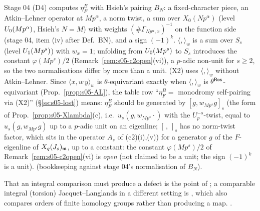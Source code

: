 \begin{remark}\label{rem:s05-BN}
Stage 04 (D4) computes $\eta^B_F$ with Hsieh's pairing $B_N$: a fixed-character piece, an Atkin--Lehner operator at $Mp^\alpha$, a norm
twist, a sum over $X_0(Np^\alpha)$ (level $U_0(Mp^\alpha)$, Hsieh's $N=M$) with weights $(\#\Gamma_{Np^\alpha,x})^{-1}$ on the function side
 (stage 04, item (iv) after Def.~BN), and a sign $(-1)^k$.
$\langle,\rangle_w$ is a sum over $S_s$ (level $U_1(Mp^s)$) with $w_x=1$; unfolding from $U_0(Mp^s)$ to $S_s$ introduces the constant $\varphi(Mp^s)/2$
(Remark~\ref{rem:s05-c2open}(vi)), a $p$-adic non-unit for $s\ge2$, so the two normalisations differ by more than a unit.
(X2) uses $\langle,\rangle_w$ without Atkin--Lehner. Since $\langle x,w\,y\rangle_w$ is $\theta$-equivariant exactly when $\langle,\rangle_w$ is
$\theta^{\mathsf{Ros}}$-equivariant (Prop.~\ref{prop:s05-AL}), the table row ``$\eta^B_F=$ monodromy self-pairing via (X2)'' (\S\ref{ss:s05-lost}) means:
$\eta^B_F$ should be generated by $[g,w_{Mp^s}g]_s$ (the form of Prop.~\ref{prop:s05-Xlambda}(c), i.e.\ $u_s(g,w_{Mp^s}\cdot)$ with the $U_p^{-s}$-twist, equal to $u_s(g,w_{Mp^s}g)$ up to a $p$-adic unit on an eigenline; $[\,,\,]_s$ has no norm-twist factor, which sits in the operator $A_s$ of (c2)(i),(v)) for a generator $g$ of the $F$-eigenline of $X_q(J_s)_{\mathfrak{m}}$, up to a constant: the constant $\varphi(Mp^s)/2$ of Remark~\ref{rem:s05-c2open}(vi) is \emph{open} (not claimed to be a unit; the sign
$(-1)^k$ is a unit). \sttoprove{} (bookkeeping against stage 04's normalisation of $B_N$).
\end{remark}

\begin{remark}[context]\label{rem:s05-context}
That an integral comparison must produce a defect is the point of
; a comparable integral
(torsion) Jacquet--Langlands in a different setting is
, which also compares orders of finite homology groups rather than producing a map. \stcited.
\end{remark}

